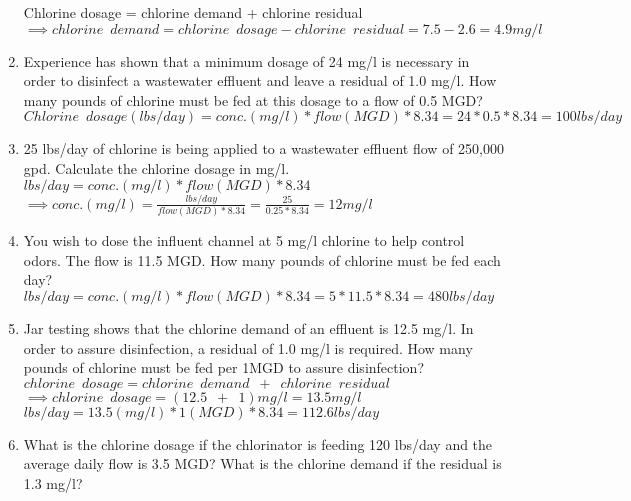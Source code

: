 \begin{enumerate}
\vspace{0.25cm}
Chlorine dosage = chlorine demand + chlorine residual\\
\vspace{0.25cm}
$ \implies chlorine \enspace demand = chlorine \enspace dosage - chlorine \enspace residual=7.5-2.6=\boxed{4.9mg/l}$\\
\vspace{0.25cm}
\item Experience has shown that a minimum dosage of 24 mg/l is necessary in order to disinfect a wastewater effluent and leave a residual of 1.0 mg/l. How many pounds of chlorine must be fed at this dosage to a flow of 0.5 MGD?\\
\vspace{0.2cm}
$Chlorine \enspace dosage (lbs/day)=conc. (mg/l)*flow(MGD)*8.34=24*0.5*8.34=\boxed{100lbs/day}$\\
\vspace{0.25cm}
\item 25 lbs/day of chlorine is being applied to a wastewater effluent flow of 250,000 gpd. Calculate the chlorine dosage in mg/l.\\
\vspace{0.25cm}
$lbs/day=conc. (mg/l)*flow(MGD)*8.34$\\
$\implies conc. (mg/l)=\frac{lbs/day}{flow(MGD)*8.34}=\frac{25}{0.25*8.34}=\boxed{12mg/l}$\\
\vspace{0.25cm}
\item You wish to dose the influent channel at 5 mg/l chlorine to help control odors. The flow is 11.5 MGD. How many pounds of chlorine must be fed each day?\\

$lbs/day=conc. (mg/l)*flow(MGD)*8.34=5*11.5*8.34=\boxed{480lbs/day}$\\

\item Jar testing shows that the chlorine demand of an effluent is 12.5 mg/l. In order to assure disinfection, a residual of 1.0 mg/l is required. How many pounds of chlorine must be fed per 1MGD to assure disinfection?\\
\vspace{0.2cm}
$ chlorine \enspace dosage = chlorine \enspace demand \enspace + \enspace chlorine \enspace residual$\\
\vspace{0.25cm}
$\implies chlorine \enspace dosage = (12.5 \enspace + \enspace 1 )mg/l=13.5 mg/l$\\
\vspace{0.25cm}
$lbs/day=13.5(mg/l)*1(MGD)*8.34=\boxed{112.6 lbs/day}$
\item What is the chlorine dosage if the chlorinator is feeding 120 lbs/day and the average daily flow is 3.5 MGD?  What is the chlorine demand if the residual is 1.3 mg/l?\\


\end{enumerate}
